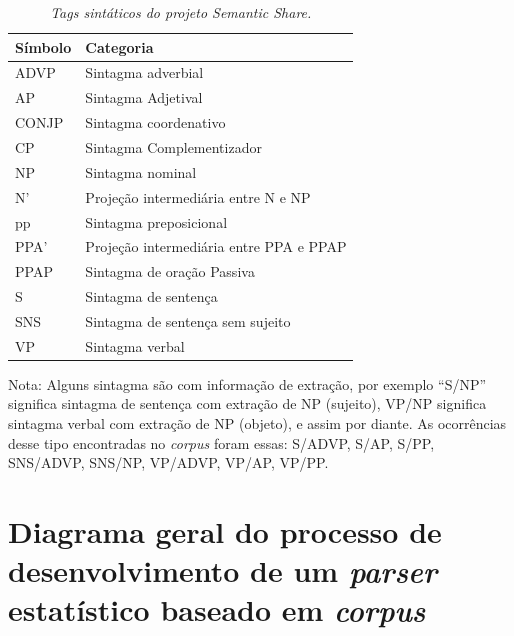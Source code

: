 \begin{table}

   \centering
   \small
   \caption{\it Tags sintáticos do projeto Semantic Share.}

    \begin{tabular}{ | p{3cm} | p{10cm} | }
      \hline
        \textbf{Símbolo} & \textbf{Categoria}\\
        \hline
        \hline

        ADVP& Sintagma adverbial \\
        \hline
        AP& Sintagma Adjetival\\
        \hline
        CONJP&Sintagma coordenativo\\
        \hline
        CP&Sintagma Complementizador\\
        \hline
        NP&Sintagma nominal\\
        \hline
        N'&Projeção intermediária entre N e NP\\
        \hline
        pp&Sintagma preposicional\\
        \hline
        PPA'&Projeção intermediária entre PPA e PPAP\\
        \hline
        PPAP&Sintagma de oração Passiva\\
        \hline
        S&Sintagma de sentença\\
        \hline
        SNS&Sintagma de sentença sem sujeito\\
        \hline
        VP&Sintagma verbal\\
        \hline

   \end{tabular}
   \label{tbl:semantic_share_cats}

\end{table}

Nota: Alguns sintagma são com informação de extração, por exemplo ``S/NP'' significa sintagma de sentença com extração de NP (sujeito), VP/NP significa sintagma verbal com extração de NP (objeto), e assim por diante. As ocorrências desse tipo encontradas no \emph{corpus} foram essas: S/ADVP, S/AP, S/PP, SNS/ADVP, SNS/NP, VP/ADVP, VP/AP, VP/PP.

\newpage

\section{Diagrama geral do processo de desenvolvimento de um \emph{parser} estatístico baseado em \emph{corpus}} %
\label{sec:diagrama_geral_do_processo_de_parsing_estatistico_baseado_em_corpus}

